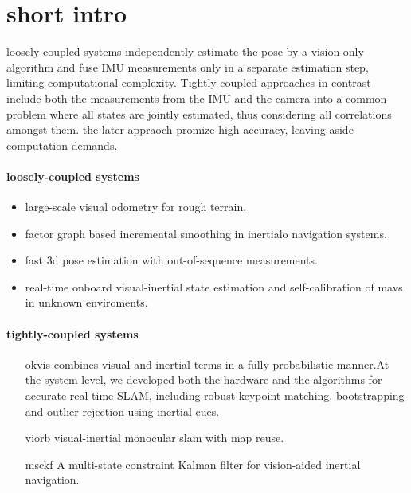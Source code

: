 \documentclass[10pt,a4paper]{article}
\begin{document}


\section{short intro}

loosely-coupled systems independently estimate the pose by a vision only algorithm and fuse IMU measurements only in a separate estimation step, limiting computational complexity. Tightly-coupled approaches
in contrast include both the measurements from the IMU and the camera into a common problem where all states are jointly estimated, thus considering all correlations amongst them. the later appraoch promize high accuracy, leaving aside computation demands.
\paragraph{loosely-coupled systems}
\begin{itemize}
	\item large-scale visual odometry for rough terrain.
	\item factor graph based incremental smoothing in inertialo navigation systems.
	\item fast 3d pose estimation with out-of-sequence measurements.
	\item real-time onboard visual-inertial state estimation and self-calibration of mavs in unknown enviroments.
\end{itemize}
\paragraph{tightly-coupled systems}
\begin{itemize}
	\item[okvis] combines visual and inertial terms in a fully probabilistic manner.At the system level, we developed both the hardware and
	the algorithms for accurate real-time SLAM, including robust keypoint matching, bootstrapping and outlier rejection using
	inertial cues.
	\item[viorb] visual-inertial monocular slam with map reuse.%
	\item[msckf] A multi-state constraint Kalman filter for vision-aided inertial navigation.%
\end{itemize}
\end{document}
